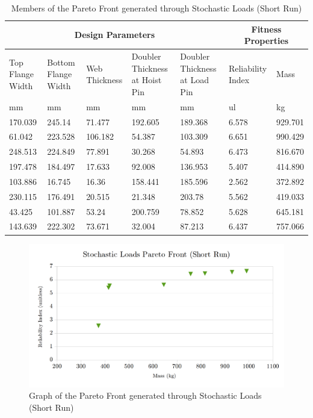 \begin{table}[!htbp]
\centering
\small
\caption{Members of the Pareto Front generated through Stochastic Loads (Short Run)}
\label{tab:pfront_sto_short}
\begin{tabular}{|p{1.5cm}p{1.5cm}p{1.4cm}p{2cm}p{2cm}||p{1.5cm}p{1.5cm}|}
\hline
\multicolumn{5}{|c||}{Design Parameters}&\multicolumn{2}{|c|}{Fitness Properties}\\
\hline
Top Flange Width&Bottom Flange Width&Web Thickness&Doubler Thickness at Hoist Pin&Doubler Thickness at Load Pin&Reliability Index& Mass\\
\hline
mm&mm&mm&mm&mm&ul&kg\\
\hline
170.039&245.14&71.477&192.605&189.368&6.578&929.701\\
61.042&223.528&106.182&54.387&103.309&6.651&990.429\\
248.513&224.849&77.891&30.268&54.893&6.473&816.670\\
197.478&184.497&17.633&92.008&136.953&5.407&414.890\\
103.886&16.745&16.36&158.441&185.596&2.562&372.892\\
230.115&176.491&20.515&21.348&203.78&5.562&419.033\\
43.425&101.887&53.24&200.759&78.852&5.628&645.181\\
143.639&222.302&73.671&32.004&87.213&6.437&757.066\\
\hline
\end{tabular}
\end{table}

\begin{figure}
\includegraphics[width=\textwidth]{img/pf_sto_short.png}
	\caption{Graph of the Pareto Front generated through Stochastic Loads (Short Run)}
\label{fig:pfront_sto_short}
\end{figure}

